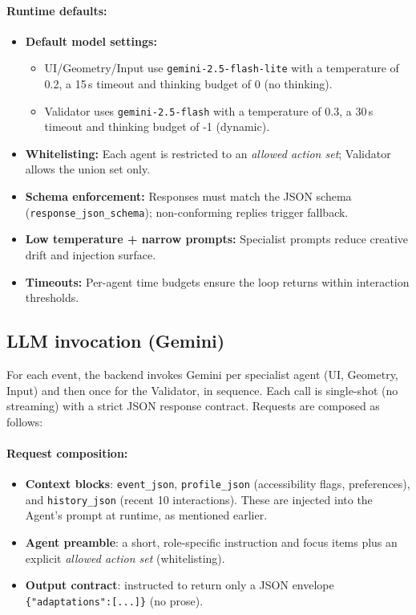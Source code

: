 \paragraph{Runtime defaults:}
\begin{itemize}
  \item \textbf{Default model settings:} 
    \begin{itemize}
        \item UI/Geometry/Input use \texttt{gemini-2.5-flash-lite} with a temperature of 0.2, a 15\,s timeout and thinking budget of 0 (no thinking).
        \item Validator uses \texttt{gemini-2.5-flash} with a temperature of 0.3, a 30\,s timeout and thinking budget of -1 (dynamic).
    \end{itemize}
  \item \textbf{Whitelisting:} Each agent is restricted to an \emph{allowed action set}; Validator allows the union set only.
  \item \textbf{Schema enforcement:} Responses must match the JSON schema (\texttt{response\_json\_schema}); non-conforming replies trigger fallback.
  \item \textbf{Low temperature + narrow prompts:} Specialist prompts reduce creative drift and injection surface.
  \item \textbf{Timeouts:} Per-agent time budgets ensure the loop returns within interaction thresholds.
\end{itemize}

\subsection{LLM invocation (Gemini)}
For each event, the backend invokes Gemini per specialist agent (UI, Geometry, Input) and then once for the Validator, in sequence. Each call is single-shot (no streaming) with a strict JSON response contract. Requests are composed as follows:

\paragraph{Request composition:}
\begin{itemize}
  \item \textbf{Context blocks}: \texttt{event\_json}, \texttt{profile\_json} (accessibility flags, preferences), and \texttt{history\_json} (recent 10 interactions). These are injected into the Agent's prompt at runtime, as mentioned earlier.
  \item \textbf{Agent preamble}: a short, role-specific instruction and focus items plus an explicit \emph{allowed action set} (whitelisting).
  \item \textbf{Output contract}: instructed to return only a JSON envelope \texttt{\{"adaptations":[...]\}} (no prose).
\end{itemize}

